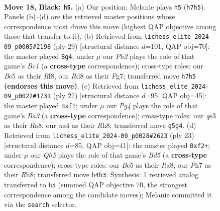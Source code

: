 \documentclass[11pt]{article}
\begin{document}
\clearpage

\begin{figure}[p]\centering
\begin{subfigure}{0.46\textwidth}\centering
\resizebox{\linewidth}{!}{%
\newchessgame
\chessboard[
  setfen={r1br4/ppp2pkp/3p4/4b1p1/N1P1Pn1q/4Q2P/PP3PP1/RBB2R1K b - - 3 18},
  showmover=false,
  pgfstyle=straightmove, color=movearrow, markmove={h7-h5}
]}
\caption{}
\end{subfigure}\hfill
\begin{subfigure}{0.46\textwidth}\centering
\resizebox{\linewidth}{!}{%
\newchessgame
\chessboard[
  setfen={r1b2rk1/5ppp/p1pb4/1p1n4/8/1BPP1QPq/PP3P1P/RNB1R1K1 b - - 2 15},
  showmover=false,
  pgfstyle=straightmove, color=movearrow, markmove={c8-g4}
]}
\caption{}
\end{subfigure}
\\[4pt]
\begin{subfigure}{0.46\textwidth}\centering
\resizebox{\linewidth}{!}{%
\newchessgame
\chessboard[
  setfen={r3k2r/2qn1ppp/bp2p3/b2pP3/3Q1P2/2P3N1/P1PB2PP/R3KB1R b KQkq - 3 14},
  showmover=false,
  pgfstyle=straightmove, color=movearrow, markmove={a6-f1}
]}
\caption{}
\end{subfigure}\hfill
\begin{subfigure}{0.46\textwidth}\centering
\resizebox{\linewidth}{!}{%
\newchessgame
\chessboard[
  setfen={r3k2r/pp2pp1p/1q4p1/3N1b1P/2Bb2n1/3P4/PPP1QPP1/R1B1K2R b KQkq - 1 12},
  showmover=false,
  pgfstyle=straightmove, color=movearrow, markmove={d4-f2}
]}
\caption{}
\end{subfigure}
\caption{\textbf{Move 18, Black: \texttt{h5}.} (a) Our position; Melanie plays \texttt{h5} (\texttt{h7h5}). Panels (b)--(d) are the retrieved master positions whose correspondence most drove this move (highest QAP objective among those that transfer to it). (b) Retrieved from \texttt{lichess\_elite\_2024-09\_p0005\#2198} (ply 29) [structural distance $d$=101, QAP obj=70]: the master played \texttt{Bg4}; under $\mu$ our \emph{Ph2} plays the role of that game's \emph{Bc1} (a \textbf{cross-type} correspondence); cross-type roles: our \emph{B}e5 as their \emph{R}f8, our \emph{R}d8 as their \emph{P}g7; transferred move \texttt{h7h5} \textbf{(endorses this move)}. (c) Retrieved from \texttt{lichess\_elite\_2024-09\_p0022\#1731} (ply 27) [structural distance $d$=95, QAP obj=45]: the master played \texttt{Bxf1}; under $\mu$ our \emph{Pg4} plays the role of that game's \emph{Ba3} (a \textbf{cross-type} correspondence); cross-type roles: our \emph{q}e3 as their \emph{R}a8, our \emph{n}a4 as their \emph{R}h8; transferred move \texttt{g5g4}. (d) Retrieved from \texttt{lichess\_elite\_2024-09\_p0028\#2623} (ply 23) [structural distance $d$=85, QAP obj=41]: the master played \texttt{Bxf2+}; under $\mu$ our \emph{Qh5} plays the role of that game's \emph{Bd5} (a \textbf{cross-type} correspondence); cross-type roles: our \emph{B}e5 as their \emph{R}a8, our \emph{P}h7 as their \emph{R}h8; transferred move \texttt{h4h3}. Synthesis: 1 retrieved analog transferred to \texttt{h5} (summed QAP objective 70, the strongest correspondence among the candidate moves); Melanie committed it via the \texttt{search} selector.}
\label{fig:thought-m35}
\end{figure}
\end{document}
